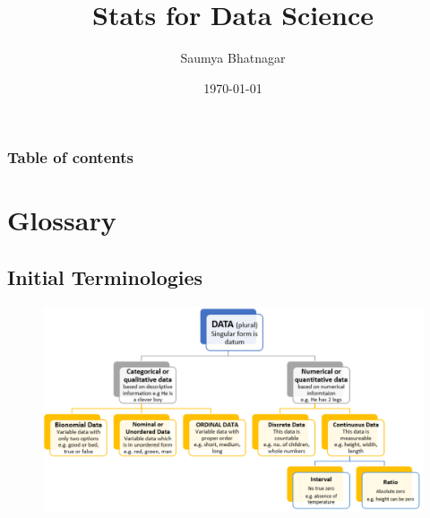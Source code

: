 \documentclass{beamer}
\begin{document}
	\title{Stats for Data Science}  
	\author{Saumya Bhatnagar}
	\date{\today} 
	
	
\begin{frame}
\titlepage
\end{frame}

\begin{frame}\frametitle{Table of contents}\tableofcontents
\end{frame} 


\section{Glossary}
\subsection{Initial Terminologies} 
\begin{frame}
\begin{figure}
	\includegraphics[scale=0.4]{Data} 
\end{figure}
\end{frame}
\end{document}
